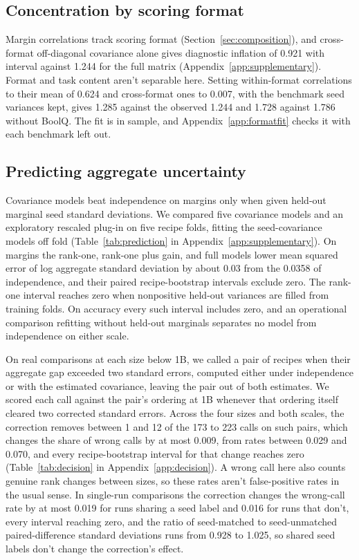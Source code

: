 \subsection{Concentration by scoring format}
Margin correlations track scoring format (Section~\ref{sec:composition}), and cross-format off-diagonal covariance alone gives diagnostic inflation of 0.921 with interval  against 1.244 for the full matrix (Appendix~\ref{app:supplementary}). Format and task content aren't separable here. Setting within-format correlations to their mean of 0.624 and cross-format ones to 0.007, with the benchmark seed variances kept, gives 1.285 against the observed 1.244 and 1.728 against 1.786 without BoolQ. The fit is in sample, and Appendix~\ref{app:formatfit} checks it with each benchmark left out.

\subsection{Predicting aggregate uncertainty}
\label{sec:prediction}
Covariance models beat independence on margins only when given held-out marginal seed standard deviations. We compared five covariance models and an exploratory rescaled plug-in on five recipe folds, fitting the seed-covariance models off fold (Table~\ref{tab:prediction} in Appendix~\ref{app:supplementary}). On margins the rank-one, rank-one plus gain, and full models lower mean squared error of log aggregate standard deviation by about 0.03 from the 0.0358 of independence, and their paired recipe-bootstrap intervals exclude zero. The rank-one interval reaches zero when nonpositive held-out variances are filled from training folds. On accuracy every such interval includes zero, and an operational comparison refitting without held-out marginals separates no model from independence on either scale.

On real comparisons at each size below 1B, we called a pair of recipes when their aggregate gap exceeded two standard errors, computed either under independence or with the estimated covariance, leaving the pair out of both estimates. We scored each call against the pair's ordering at 1B whenever that ordering itself cleared two corrected standard errors. Across the four sizes and both scales, the correction removes between 1 and 12 of the 173 to 223 calls on such pairs, which changes the share of wrong calls by at most 0.009, from rates between 0.029 and 0.070, and every recipe-bootstrap interval for that change reaches zero (Table~\ref{tab:decision} in Appendix~\ref{app:decision}). A wrong call here also counts genuine rank changes between sizes, so these rates aren't false-positive rates in the usual sense. In single-run comparisons the correction changes the wrong-call rate by at most 0.019 for runs sharing a seed label and 0.016 for runs that don't, every interval reaching zero, and the ratio of seed-matched to seed-unmatched paired-difference standard deviations runs from 0.928 to 1.025, so shared seed labels don't change the correction's effect.


